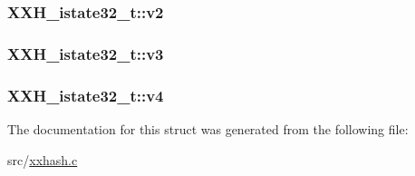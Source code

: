 \subsubsection[{v2}]{ X\+X\+H\+\_\+istate32\+\_\+t\+::v2}\label{struct_x_x_h__istate32__t_a2e56f8d3931253d5706f6354c228e7c4}
\hypertarget{struct_x_x_h__istate32__t_ae19dc091e2c1c51e516024137603cd4a}{}
\subsubsection[{v3}]{ X\+X\+H\+\_\+istate32\+\_\+t\+::v3}\label{struct_x_x_h__istate32__t_ae19dc091e2c1c51e516024137603cd4a}
\hypertarget{struct_x_x_h__istate32__t_a8ca5625843153eb81437e9cee7364c1c}{}
\subsubsection[{v4}]{ X\+X\+H\+\_\+istate32\+\_\+t\+::v4}\label{struct_x_x_h__istate32__t_a8ca5625843153eb81437e9cee7364c1c}


The documentation for this struct was generated from the following file\+:\begin{DoxyCompactItemize}
\item 
src/\hyperlink{xxhash_8c}{xxhash.\+c}\end{DoxyCompactItemize}
